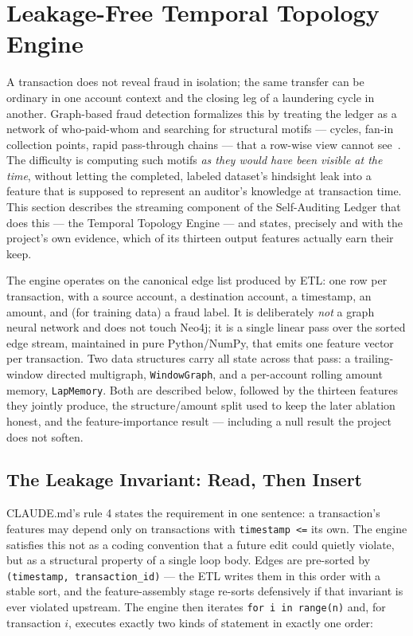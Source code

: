 \section{Leakage-Free Temporal Topology Engine}\label{sec:engine}

A transaction does not reveal fraud in isolation; the same transfer can be
ordinary in one account context and the closing leg of a laundering cycle in
another. Graph-based fraud detection formalizes this by treating the ledger as
a network of who-paid-whom and searching for structural motifs — cycles,
fan-in collection points, rapid pass-through chains — that a row-wise view
cannot see~\cite{motie2024gnn,yuan2025survey,salih2021survey}. The difficulty
is computing such motifs \emph{as they would have been visible at the time},
without letting the completed, labeled dataset's hindsight leak into a
feature that is supposed to represent an auditor's knowledge at transaction
time. This section describes the streaming component of the Self-Auditing
Ledger that does this — the Temporal Topology Engine — and states, precisely
and with the project's own evidence, which of its thirteen output features
actually earn their keep.

The engine operates on the canonical edge list produced by ETL: one row per
transaction, with a source account, a destination account, a timestamp, an
amount, and (for training data) a fraud label. It is deliberately \emph{not}
a graph neural network and does not touch Neo4j; it is a single linear pass
over the sorted edge stream, maintained in pure Python/NumPy, that emits one
feature vector per transaction. Two data structures carry all state across
that pass: a trailing-window directed multigraph, \texttt{WindowGraph}, and a
per-account rolling amount memory, \texttt{LapMemory}. Both are described
below, followed by the thirteen features they jointly produce, the
structure/amount split used to keep the later ablation honest, and the
feature-importance result — including a null result the project does not
soften.

\subsection{The Leakage Invariant: Read, Then Insert}\label{sec:engine-invariant}

CLAUDE.md's rule 4 states the requirement in one sentence: a transaction's
features may depend only on transactions with \texttt{timestamp <=} its own.
The engine satisfies this not as a coding convention that a future edit could
quietly violate, but as a structural property of a single loop body. Edges
are pre-sorted by \texttt{(timestamp, transaction\_id)} — the ETL writes them
in this order with a stable sort, and the feature-assembly stage re-sorts
defensively if that invariant is ever violated upstream. The engine then
iterates \texttt{for i in range(n)} and, for transaction $i$, executes
exactly two kinds of statement in exactly one order:

